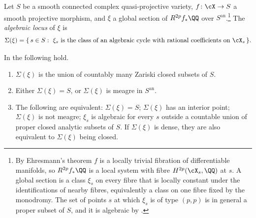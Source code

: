 \begin{definition}\label{def:algloc}
Let $S$ be a smooth connected complex quasi-projective variety,
$f\colon\cX\to S$ a smooth projective morphism, and $\xi$ a global section of
$R^{2p}f_{*}\QQ$ over $S^{\mathrm{an}}$.\footnote{By Ehresmann's theorem $f$
is a locally trivial fibration of differentiable manifolds, so
$R^{2p}f_{*}\QQ$ is a local system with fibre $H^{2p}(\cX_{s},\QQ)$ at $s$. A
global section is a class $\xi_{s}$ on every fibre that is locally constant
under the identifications of nearby fibres, equivalently a class on one fibre
fixed by the monodromy. The set of points $s$ at which $\xi_{s}$ is of type
$(p,p)$ is in general a proper subset of $S$, and it is algebraic by
\cite[Theorem~B.6]{paperI}.} The \emph{algebraic locus} of $\xi$
is
\[
  \Sigma(\xi)=\{\,s\in S:\ \xi_{s}\ \text{is the class of an algebraic cycle
  with rational coefficients on}\ \cX_{s}\,\}.
\]
\end{definition}

\begin{lemma}\label{lem:algstrata}
In  the following hold.
\begin{enumerate}[label=\textup{(\roman*)},leftmargin=2.6em,itemsep=2pt]
\item $\Sigma(\xi)$ is the union of countably many Zariski closed subsets of
  $S$.
\item Either $\Sigma(\xi)=S$, or $\Sigma(\xi)$ is meagre in $S^{\mathrm{an}}$.
\item The following are equivalent: $\Sigma(\xi)=S$; $\Sigma(\xi)$ has an
  interior point; $\Sigma(\xi)$ is not meagre; $\xi_{s}$ is algebraic for
  every $s$ outside a countable union of proper closed analytic subsets of
  $S$. If $\Sigma(\xi)$ is dense, they are also equivalent to $\Sigma(\xi)$
  being closed.
\end{enumerate}
\end{lemma}

